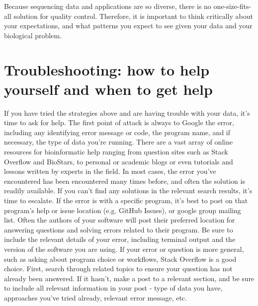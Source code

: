 \documentclass[10pt,letterpaper]{article}
\begin{document}
Because sequencing data and applications are so diverse, there is no one-size-fits-all solution for quality control. 
Therefore, it is important to think critically about your expectations, and what patterns you expect to see given your data and your biological problem. 


\section*{Troubleshooting: how to help yourself and when to get help}

If you have tried the strategies above and are having trouble with your data, it’s time to ask for help. 
The first point of attack is always to Google the error, including any identifying error message or code, the program name, and if necessary, the type of data you’re running. 
There are a vast array of online resources for bioinformatic help ranging from question sites such as Stack Overflow and BioStars, to personal or academic blogs or even tutorials and lessons written by experts in the field. 
In most cases, the error you’ve encountered has been encountered many times before, and often the solution is readily available. 
If you can’t find any solutions in the relevant search results, it’s time to escalate. 
If the error is with a specific program, it’s best to post on that program’s help or issue location (e.g. GitHub Issues), or google group mailing list. 
Often the authors of your software will post their preferred location for answering questions and solving errors related to their program. 
Be sure to include the relevant details of your error, including terminal output and the version of the software you are using.
 If your error or question is more general, such as asking about program choice or workflows, Stack Overflow is a good choice. 
First, search through related topics to ensure your question has not already been answered. 
If it hasn’t, make a post to a relevant section, and be sure to include all relevant information in your post - type of data you have, approaches you’ve tried already, relevant error message, etc. 
\end{document}
